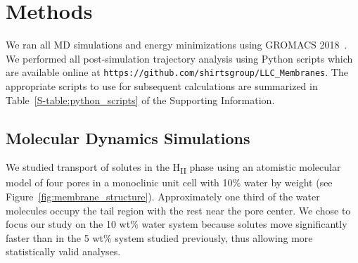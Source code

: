 \documentclass[journal=jctcce,manuscript=article]{achemso}
\begin{document}
  \section{Methods}
    
  We ran all MD simulations and energy minimizations using GROMACS
  2018~\cite{bekker_gromacs:_1993,berendsen_gromacs:_1995,van_der_spoel_gromacs:_2005,hess_gromacs_2008}.
  We performed all post-simulation trajectory analysis using Python scripts
  which are available online at
  \texttt{https://github.com/shirtsgroup/LLC\_Membranes}. The appropriate
  scripts to use for subsequent calculations are summarized in
  Table~\ref{S-table:python_scripts} of the Supporting Information.
  
  \subsection{Molecular Dynamics Simulations}

  We studied transport of solutes in the H\textsubscript{II} phase using an
  atomistic molecular model of four pores in a monoclinic unit cell with 10\%
  water by weight (see Figure~\ref{fig:membrane_structure}). Approximately one
  third of the water molecules occupy the tail region with the rest near the
  pore center. We chose to focus our study on the 10 wt\% water system because
  solutes move significantly faster than in the 5 wt\% system studied
  previously, thus allowing more statistically valid analyses.
  
\end{document}
